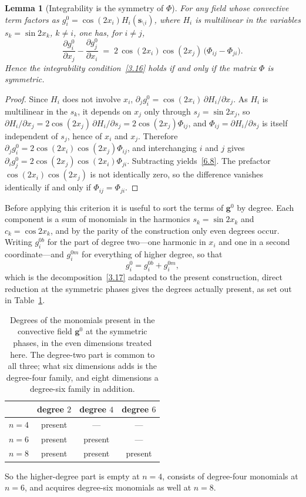 \documentclass[11pt]{jfm}
\newtheorem{lemma}{Lemma}[section]
\numberwithin{equation}{section}
\begin{document}
\begin{lemma}[Integrability is the symmetry of $\Phi$]
\label{lem:phi}
For any field whose convective term factors as $g_i^0=\cos(2x_i)H_i(\boldsymbol{s}_{\setminus i})$, where $H_i$ is multilinear in the variables $s_k=\sin 2x_k$, $k\neq i$, one has, for $i\neq j$,
\begin{equation}
\label{6.8}
\frac{\partial g_i^0}{\partial x_j}-\frac{\partial g_j^0}{\partial x_i}
\;=\;
2\,\cos(2 x_i)\cos(2 x_j)\,\bigl(\Phi_{ij}-\Phi_{ji}\bigr).
\end{equation}
Hence the integrability condition~\eqref{3.16} holds if and only if the matrix $\Phi$ is
symmetric.
\end{lemma}

\begin{proof}
Since $H_i$ does not involve $x_i$, $\partial_j g_i^0=\cos(2x_i)\,\partial H_i/\partial x_j$.
As $H_i$ is multilinear in the $s_k$, it depends on $x_j$ only through $s_j=\sin 2x_j$, so $\partial H_i/\partial x_j=2\cos(2x_j)\,\partial H_i/\partial s_j = 2\cos(2x_j)\Phi_{ij}$, and $\Phi_{ij}=\partial H_i/\partial s_j$ is itself independent of $s_j$, hence of $x_i$ and $x_j$. Therefore
$\partial_j g_i^0 = 2\cos(2x_i)\cos(2x_j)\Phi_{ij}$, and interchanging $i$ and $j$ gives
$\partial_i g_j^0 = 2\cos(2x_j)\cos(2x_i)\Phi_{ji}$. Subtracting yields~\eqref{6.8}. The
prefactor $\cos(2x_i)\cos(2x_j)$ is not identically zero, so the difference vanishes
identically if and only if $\Phi_{ij}=\Phi_{ji}$.
\end{proof}

Before applying this criterion it is useful to sort the terms of $\boldsymbol{g}^0$ by degree.
Each component is a sum of monomials in the harmonics $s_k=\sin 2x_k$ and $c_k=\cos 2x_k$, and by
the parity of the construction only even degrees occur. Writing $g_i^{0b}$ for the part of degree
two---one harmonic in $x_i$ and one in a second coordinate---and $g_i^{0m}$ for everything of
higher degree, so that
\[
g_i^0 = g_i^{0b} + g_i^{0m},
\]
which is the decomposition~\eqref{3.17} adapted to the present construction, direct reduction
at the symmetric phases gives the degrees actually present, as set out in
Table~\ref{tab:degrees}.
\begin{table}
\centering
\begin{tabular}{lccc}
\hline
 & degree $2$ & degree $4$ & degree $6$\\
\hline
$n=4$ & present & --- & ---\\
$n=6$ & present & present & ---\\
$n=8$ & present & present & present\\
\hline
\end{tabular}
\caption{Degrees of the monomials present in the convective field $\boldsymbol{g}^0$ at the
symmetric phases, in the even dimensions treated here. The degree-two part is common to all three;
what six dimensions adds is the degree-four family, and eight dimensions a degree-six family in
addition.}
\label{tab:degrees}
\end{table}
So the higher-degree part is empty at $n=4$, consists of degree-four monomials at $n=6$, and
acquires degree-six monomials as well at $n=8$.
\end{document}
